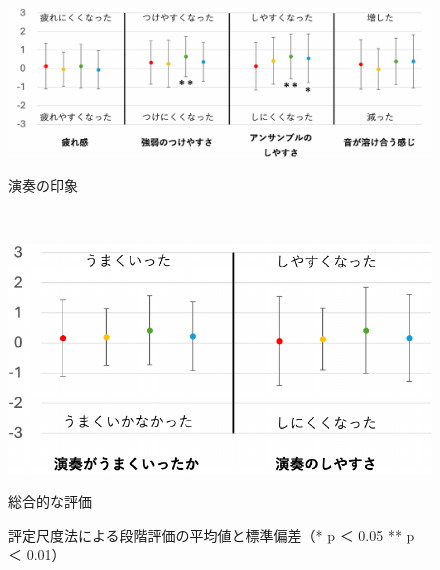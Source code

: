 \documentclass[11pt,a4j]{jreport}
\begin{document}
\begin{figure}[H]
    \begin{minipage}{1\linewidth}
      \centering
      \includegraphics[scale=.55]{images/subjectiveExp/statisticAnalysis/03performance_a.pdf}
      \caption*{演奏の印象}
      \label{fig:演奏の印象}
    \end{minipage}
    \\
    \vspace{1\baselineskip}
    \begin{minipage}{1\linewidth}
      \centering
      \includegraphics[scale=.55]{images/subjectiveExp/statisticAnalysis/04overall_a.pdf}
      \caption*{総合的な評価}
      \label{fig:総合的な評価}
    \end{minipage}
    

    \caption{評定尺度法による段階評価の平均値と標準偏差（* p ＜ 0.05 \hspace{5mm} ** p ＜ 0.01）}
    \label{fig:評定尺度法による段階評価の平均値と標準偏差}
  \end{figure}


  \clearpage
\end{document}
